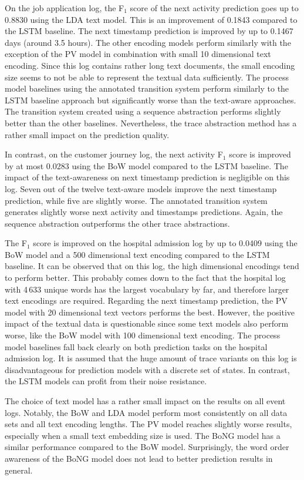 On the job application log, the F$_1$ score of the next activity prediction goes up to 0.8830 using the LDA text model.
This is an improvement of 0.1843 compared to the LSTM baseline.
The next timestamp prediction is improved by up to 0.1467 days (around 3.5 hours).
The other encoding models perform similarly with the exception of the PV model in combination with small 10 dimensional text encoding.
Since this log contains rather long text documents, the small encoding size seems to not be able to represent the textual data sufficiently.
The process model baselines using the annotated transition system perform similarly to the LSTM baseline approach but significantly worse than the text-aware approaches.
The transition system created using a sequence abstraction performs slightly better than the other baselines.
Nevertheless, the trace abstraction method has a rather small impact on the prediction quality.

In contrast, on the customer journey log, the next activity F$_1$ score is improved by at most 0.0283 using the BoW model compared to the LSTM baseline.
The impact of the text-awareness on next timestamp prediction is negligible on this log.
Seven out of the twelve text-aware models improve the next timestamp prediction, while five are slightly worse.
The annotated transition system generates slightly worse next activity and timestamps predictions.
Again, the sequence abstraction outperforms the other trace abstractions.

The F$_1$ score is improved on the hospital admission log by up to 0.0409 using the BoW model and a 500 dimensional text encoding compared to the LSTM baseline.
It can be observed that on this log, the high dimensional encodings tend to perform better.
This probably comes down to the fact that the hospital log with 4\,633 unique words has the largest vocabulary by far, and therefore larger text encodings are required.
Regarding the next timestamp prediction, the PV model with 20 dimensional text vectors performs the best.
However, the positive impact of the textual data is questionable since some text models also perform worse, like the BoW model with 100 dimensional text encoding.
The process model baselines fall back clearly on both prediction tasks on the hospital admission log.
It is assumed that the huge amount of trace variants on this log is disadvantageous for prediction models with a discrete set of states.
In contrast, the LSTM models can profit from their noise resistance.

The choice of text model has a rather small impact on the results on all event logs.
Notably, the BoW and LDA model perform most consistently on all data sets and all text encoding lengths.
The PV model reaches slightly worse results, especially when a small text embedding size is used.
The BoNG model has a similar performance compared to the BoW model.
Surprisingly, the word order awareness of the BoNG model does not lead to better prediction results in general.

